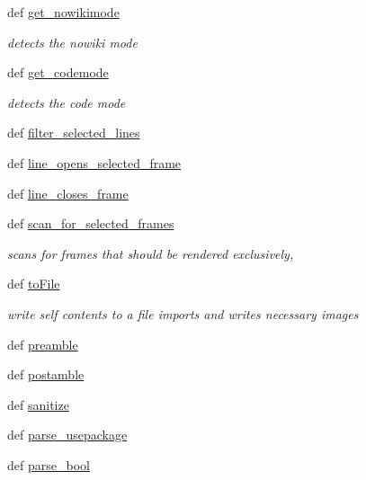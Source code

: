 \begin{DoxyCompactItemize}
def \hyperlink{classuicilibris_1_1w2beamer_1_1wiki2_af68e65aca522a38a04e2b554fb4cc98c}{get\-\_\-nowikimode}
\begin{DoxyCompactList}\small\item\em detects the nowiki mode \end{DoxyCompactList}\item 
def \hyperlink{classuicilibris_1_1w2beamer_1_1wiki2_aab79bbf3c6b27cba081295252a0f63fa}{get\-\_\-codemode}
\begin{DoxyCompactList}\small\item\em detects the code mode \end{DoxyCompactList}\item 
def \hyperlink{classuicilibris_1_1w2beamer_1_1wiki2_a809b414c1e85e5fc3728f6bec32d66f0}{filter\-\_\-selected\-\_\-lines}
\item 
def \hyperlink{classuicilibris_1_1w2beamer_1_1wiki2_abdb2ad16c119a59eb3d838479cd0db22}{line\-\_\-opens\-\_\-selected\-\_\-frame}
\item 
def \hyperlink{classuicilibris_1_1w2beamer_1_1wiki2_ae866f3fb49a8c3c476ae5c51bd3c282f}{line\-\_\-closes\-\_\-frame}
\item 
def \hyperlink{classuicilibris_1_1w2beamer_1_1wiki2_a47e7bd249b927ebd52ba22bbcf16d6f9}{scan\-\_\-for\-\_\-selected\-\_\-frames}
\begin{DoxyCompactList}\small\item\em scans for frames that should be rendered exclusively, \end{DoxyCompactList}\item 
def \hyperlink{classuicilibris_1_1w2beamer_1_1wiki2_a892e27ee6139696d7772ac11118ea6ee}{to\-File}
\begin{DoxyCompactList}\small\item\em write self contents to a file imports and writes necessary images \end{DoxyCompactList}\item 
def \hyperlink{classuicilibris_1_1w2beamer_1_1wiki2_a2be6afaaf8c4b02ad3df12be1751ac3a}{preamble}
\item 
def \hyperlink{classuicilibris_1_1w2beamer_1_1wiki2_a4d27e7f20c69d4f9e81f99e259b9db20}{postamble}
\item 
def \hyperlink{classuicilibris_1_1w2beamer_1_1wiki2_a50b485f8952af9ce68fb9ab66eb6731f}{sanitize}
\item 
def \hyperlink{classuicilibris_1_1w2beamer_1_1wiki2_af6b7872773c2e736d638fa632d2b03fe}{parse\-\_\-usepackage}
\item 
def \hyperlink{classuicilibris_1_1w2beamer_1_1wiki2_a26ffbd6fc6b88ef262e2bbdf6bcc3ab8}{parse\-\_\-bool}
\end{DoxyCompactItemize}


